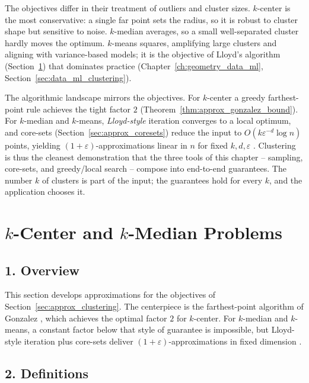 The objectives differ in their treatment of outliers and cluster sizes.
$k$-center is the most conservative: a single far point sets the radius, so
it is robust to cluster shape but sensitive to noise. $k$-median averages,
so a small well-separated cluster hardly moves the optimum. $k$-means
squares, amplifying large clusters and aligning with variance-based models;
it is the objective of Lloyd's algorithm
(Section~\ref{sec:approx_k_center_median}) that dominates practice
(Chapter~\ref{ch:geometry_data_ml}, Section~\ref{sec:data_ml_clustering}).

The algorithmic landscape mirrors the objectives. For $k$-center a greedy
farthest-point rule achieves the tight factor $2$
(Theorem~\ref{thm:approx_gonzalez_bound}). For $k$-median and $k$-means,
\emph{Lloyd-style} iteration converges to a local optimum, and core-sets
(Section~\ref{sec:approx_coresets}) reduce the input to
$O(k \varepsilon^{-d} \log n)$ points, yielding $(1 + \varepsilon)$-approximations
linear in $n$ for fixed $k, d, \varepsilon$ \cite{harpeled2004}. Clustering
is thus the cleanest demonstration that the three tools of this chapter --
sampling, core-sets, and greedy/local search -- compose into end-to-end
guarantees. The number $k$ of clusters is part of the input; the guarantees
hold for every $k$, and the application chooses it.


\section{\texorpdfstring{$k$}{k}-Center and \texorpdfstring{$k$}{k}-Median Problems}
\label{sec:approx_k_center_median}

\subsection{1. Overview}

This section develops approximations for the objectives of
Section~\ref{sec:approx_clustering}. The centerpiece is the farthest-point
algorithm of Gonzalez \cite{gonzalez1985}, which achieves the optimal factor
$2$ for $k$-center. For $k$-median and $k$-means, a constant factor below
that style of guarantee is impossible, but Lloyd-style iteration
\cite{lloyd1982} plus core-sets deliver $(1 + \varepsilon)$-approximations
in fixed dimension \cite{harpeled2004}.

\subsection{2. Definitions}

